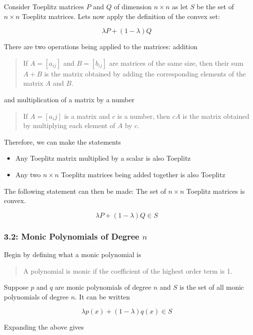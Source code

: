 \documentclass[11pt,a4paper,final]{article}
\begin{document}
Consider Toeplitz matrices \(P\) and \(Q\) of dimension \(n \times n\) as let \(S\) be the set of \(n\times n\) Toeplitz matrices. Lets now apply the definition of the convex set:

$$
\lambda P + (1 - \lambda)Q
$$

There are two operations being applied to the matrices: addition

\begin{quote}
If \(A = [a_{ij}]\) and \(B = [b_{ij}]\) are matrices of the same size, then their sum \(A+B\) is the matrix obtained by
adding the corresponding elements of the matrix \(A\) and \(B\).
\end{quote}

and multiplication of a matrix by a number

\begin{quote}
If \(A = [a_ij]\) is a matrix and \(c\) is a number, then \(cA\) is the matrix obtained by multiplying each element of \(A\) by
\(c\).
\end{quote}

Therefore, we can make the statements

\begin{itemize}
\item Any Toeplitz matrix multiplied by a scalar is also Toeplitz
\item Any two \(n \times n\) Toeplitz matrices being added together is also Toeplitz
\end{itemize}

The following statement can then be made: The set of \(n \times n\) Toeplitz matrices is convex.

$$
\lambda P + (1 - \lambda)Q \in S
$$

\subsubsection{3.2: Monic Polynomials of Degree \(n\)}
\label{sec:org251cd56}
Begin by defining what a monic polynomial is

\begin{quote}
A polynomial is monic if the coefficient of the highest order term is 1.
\end{quote}

Suppose \(p\) and \(q\) are monic polynomials of degree \(n\) and \(S\) is the set of all monic polynomials of degree \(n\). It
can be written

$$
\lambda p(x) + (1 - \lambda)q(x) \in S
$$

Expanding the above gives
\end{document}
